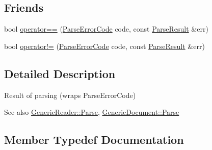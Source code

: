 \subsection*{Friends}
\begin{DoxyCompactItemize}
\item 
bool \hyperlink{structParseResult_a58c9982e833d1c74686506ac7449200c}{operator==} (\hyperlink{group__RAPIDJSON__ERRORS_ga8d4b32dfc45840bca189ade2bbcb6ba7}{Parse\+Error\+Code} code, const \hyperlink{structParseResult}{Parse\+Result} \&err)
\item 
bool \hyperlink{structParseResult_a0498aebcfdd3d4a5dcb989ee29b93d4d}{operator!=} (\hyperlink{group__RAPIDJSON__ERRORS_ga8d4b32dfc45840bca189ade2bbcb6ba7}{Parse\+Error\+Code} code, const \hyperlink{structParseResult}{Parse\+Result} \&err)
\end{DoxyCompactItemize}


\subsection{Detailed Description}
Result of parsing (wraps Parse\+Error\+Code) 


 \begin{DoxySeeAlso}{See also}
\hyperlink{classGenericReader_a0c450620d14ff1824e58bb7bd9b42099}{Generic\+Reader\+::\+Parse}, \hyperlink{classGenericDocument_aadee36db7064cc9894a75c848831cdae}{Generic\+Document\+::\+Parse} 
\end{DoxySeeAlso}


\subsection{Member Typedef Documentation}
\mbox{\label{structParseResult_a991cd2759ba802bdb5e960d40890e874}} 
